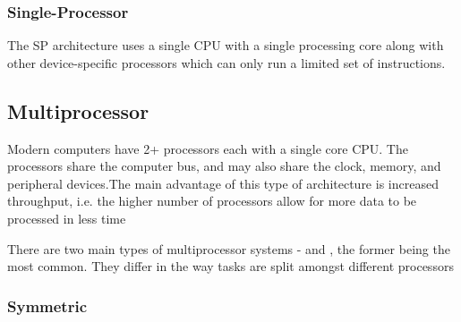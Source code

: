 


	\subsubsection{Single-Processor}

	\par{The SP architecture uses a single CPU with a single processing core along with other device-specific processors which can only run a limited set of instructions.}


	\subsection{Multiprocessor}



		\par{Modern computers have 2+ processors each with a single core CPU. The processors share the computer bus, and may also share the clock, memory, and peripheral devices.The main advantage of this type of architecture is increased throughput, i.e. the higher number of processors allow for more data to be processed in less time}


		\par{There are two main types of multiprocessor systems -  and , the former being the most common. They differ in the way tasks are split amongst different processors}

		\subsubsection{Symmetric}

